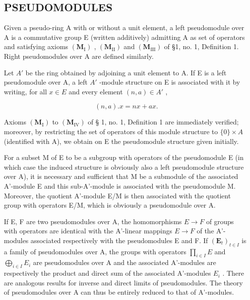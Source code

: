 \subsection{PSEUDOMODULES}

Given a pseudo-ring A with or without a unit element, a left pseudomodule over A is a commutative group E (written additively) admitting A as set of operators and satisfying axioms \((\mathbf{M}_{\mathrm{I}})\) , \((\mathbf{M}_{\mathrm{II}})\) and \((\mathbf{M}_{\mathrm{III}})\) of §1, no. 1, Definition 1. Right pseudomodules over A are defined similarly.

Let \(A'\) be the ring obtained by adjoining a unit element to A. If E is a left pseudomodule over A, a left \(A'\) -module structure on E is associated with it by writing, for all \(x \in E\) and every element \((n, a) \in A'\) ,

\[
(n, a). x = n x + a x.\tag{2}
\]

Axioms \((\mathbf{M}_{\mathrm{I}})\) to \((\mathbf{M}_{\mathrm{IV}})\) of § 1, no. 1, Definition 1 are immediately verified; moreover, by restricting the set of operators of this module structure to \(\{0\} \times A\) (identified with A), we obtain on E the pseudomodule structure given initially.

For a subset M of E to be a subgroup with operators of the pseudomodule E (in which case the induced structure is obviously also a left pseudomodule structure over A), it is necessary and sufficient that M be a submodule of the associated A'-module E and this sub-A'-module is associated with the pseudomodule M. Moreover, the quotient A'-module E/M is then associated with the quotient group with operators E/M, which is obviously a pseudomodule over A.

If E, F are two pseudomodules over A, the homomorphisms \(E \rightarrow F\) of groups with operators are identical with the A'-linear mappings \(E \rightarrow F\) of the A'-modules associated respectively with the pseudomodules E and F. If \((\mathbf{E}_{t})_{t \in I}\) is a family of pseudomodules over A, the groups with operators \(\prod_{i\in I}E\) and \(\bigoplus_{i\in I}E_{i}\) are pseudomodules over A and the associated A'-modules are respectively the product and direct sum of the associated A'-modules \(E_{i}\) . There are analogous results for inverse and direct limits of pseudomodules. The theory of pseudomodules over A can thus be entirely reduced to that of A'-modules.

